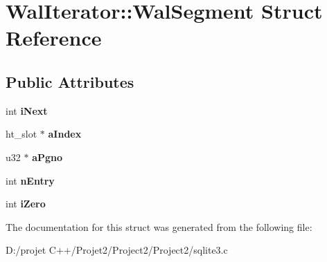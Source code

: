 \hypertarget{struct_wal_iterator_1_1_wal_segment}{}\section{Wal\+Iterator\+:\+:Wal\+Segment Struct Reference}
\label{struct_wal_iterator_1_1_wal_segment}
\subsection*{Public Attributes}
\begin{DoxyCompactItemize}
\item 
\mbox{\label{struct_wal_iterator_1_1_wal_segment_a329c939b196f907fe98cf762bb07d291}} 
int {\bfseries i\+Next}
\item 
\mbox{\label{struct_wal_iterator_1_1_wal_segment_adec397836a127acafcc551cb1fdcd851}} 
ht\+\_\+slot $\ast$ {\bfseries a\+Index}
\item 
\mbox{\label{struct_wal_iterator_1_1_wal_segment_a5e43273a11dc5856934834c0cdf7f198}} 
u32 $\ast$ {\bfseries a\+Pgno}
\item 
\mbox{\label{struct_wal_iterator_1_1_wal_segment_ad80cf479aa670eda7aa1adee607af7d9}} 
int {\bfseries n\+Entry}
\item 
\mbox{\label{struct_wal_iterator_1_1_wal_segment_a3eedec5e8e8dd94be670d50ac144a959}} 
int {\bfseries i\+Zero}
\end{DoxyCompactItemize}


The documentation for this struct was generated from the following file\+:\begin{DoxyCompactItemize}
\item 
D\+:/projet C++/\+Projet2/\+Project2/\+Project2/sqlite3.\+c\end{DoxyCompactItemize}
